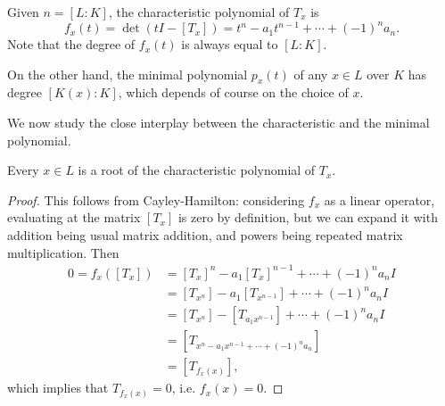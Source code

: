 Given $n=[L : K]$, the characteristic polynomial of $T_x$ is
\[
	f_x(t) = \det(tI - [T_x]) = t^n - a_1t^{n-1} + \cdots + (-1)^na_n.
\]
Note that the degree of $f_x(t)$ is always equal to $[L:K]$.

On the other hand, the minimal polynomial $p_x(t)$ of any $x\in L$ over $K$ has degree $[K(x) : K]$, which depends of course on the choice of $x$.



We now study the close interplay between the characteristic and the minimal polynomial.

\begin{prop}
	Every $x \in L$ is a root of the characteristic polynomial of $T_x$.
\end{prop}
\begin{proof}
	This follows from Cayley-Hamilton: considering $f_x$ as a linear operator, evaluating at the matrix $[T_x]$ is zero by definition, but we can expand it with addition being usual matrix addition, and powers being repeated matrix multiplication. Then
	\begin{align*}
		0 = f_x([T_x]) &= [T_x]^n - a_1[T_x]^{n-1} + \cdots + (-1)^na_n I\\
			&= [T_{x^n}] - a_1[T_{x^{n-1}}] + \cdots + (-1)^na_n I\\
			&= [T_{x^n}] - [T_{a_1x^{n-1}}] + \cdots + (-1)^na_n I\\
			&= [T_{x^n-a_1x^{n-1} + \cdots + (-1)^na_n}]\\
			&= [T_{f_x(x)}],
	\end{align*}
	which implies that $T_{f_x(x)}=0$, i.e. $f_x(x)=0$.
\end{proof}

